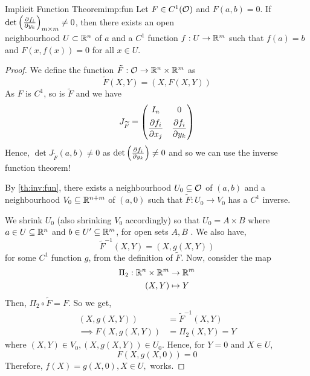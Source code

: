 \documentclass[../Analysis-3.tex]{subfiles}
\begin{document}
\begin{Thm}{Implicit Function Theorem}{imp:fun}
 Let \( F \in C^1(\mathcal{O}_{}) \) and \( F(a,b) = 0 \). If \( \det \left( \pdv{f_i}{y_k}(a,b) \right)_{m \times m} \neq 0 \), then there exists an open \\neighbourhood \( U \subset \mathbb{R}^n \) of \( a \) and a \( C^1 \) function \( f : U \to \mathbb{R}^m \) such that \( f(a) = b \) and \( F(x,f(x)) = 0 \) for all \( x \in U \).
 \end{Thm}
\begin{proof} 
  We define the function \( \tilde{F} : \mathcal{O}_{} \to \mathbb{R}^n \times \mathbb{R}^m \) as
  \[ 
   \widetilde{F}(X,Y) = (X, F(X,Y)) 
   \]
   As \( F \) is \( C^1 \), so is \( \widetilde{F} \) and we have
   \[ 
    J_{\widetilde{F}} = \begin{pmatrix}
       I_n & 0 \\[5pt]
       \displaystyle\pdv{f_i}{x_j} & \displaystyle\pdv{f_i}{y_k} 
    \end{pmatrix}
    \]
    Hence, \( \det J_{\widetilde{F}}(a,b) \neq 0 \) as \( \det \left( \pdv{f_i}{y_k}(a,b) \right) \neq 0 \) and so we can use the inverse function theorem!

    By \ref{th:inv:fun}, there exists a neighbourhood \( U_0 \subseteq \mathcal{O}_{} \) of \( (a,b) \) and a neighbourhood \( V_0 \subseteq \mathbb{R}^{n+m} \) of \( (a,0) \) such that \( \widetilde{F}: U_0 \to V_0 \) has a \( C^1 \) inverse.
    \smallskip

    We shrink \( U_0 \) (also shrinking \( V_0 \) accordingly) so that \( U_0 = A \times B \) where \( a \in U \subseteq \mathbb{R}^n \) and \( b \in U' \subseteq \mathbb{R}^m \), for open sets \( A,B \) . We also have, 
    \[ 
     \widetilde{F}^{-1}(X,Y) = (X, g(X,Y)) 
     \]
     for some \( C^1 \) function \( g \), from the definition of \( \widetilde{F} \). Now, consider the map
     \begin{align*}
       \Pi_2 : \mathbb{R}^n \times \mathbb{R}^m &\to \mathbb{R}^m \\
       (X,Y) &\mapsto Y
     \end{align*}
     Then, \( \Pi_2 \circ \widetilde{F} = F \). So we get,
     \begin{align*}
       (X, g(X,Y)) &= \widetilde{F}^{-1}(X,Y) \\
       \implies F(X,g(X,Y)) &= \Pi_2(X,Y) = Y 
     \end{align*}
     where \( (X,Y) \in V_0, (X,g(X,Y)) \in U_0 \). Hence, for \( Y = 0 \) and \( X \in U \),
     \[ 
      F(X, g(X,0)) = 0
      \]
      Therefore, \( f(X) = g(X, 0), X \in U, \) works.
    \end{proof}
\pagebreak
\end{document}
